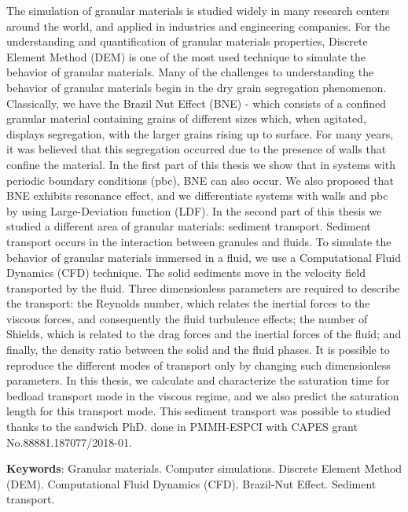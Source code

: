 
\begin{resumo}[Abstract]
    The simulation of granular materials is studied widely in many research centers around the world, and applied in industries and engineering companies. For the understanding and quantification of granular materials properties, Discrete Element Method (DEM) is one of the most used technique to simulate the behavior of granular materials.
    Many of the challenges to understanding the behavior of granular materials begin in the dry grain segregation phenomenon. Classically, we have the Brazil Nut Effect (BNE) - which consists of a confined granular material containing grains of different sizes which, when agitated, displays segregation, with the larger grains rising up to surface. For many years, it was believed that this segregation occurred due to the presence of walls that confine the material. In the first part of this thesis we show that in systems with periodic boundary conditions (pbc), BNE can also occur. We also proposed that BNE exhibits resonance effect, and we differentiate systems with walls and pbc by using Large-Deviation function (LDF).
    In the second part of this thesis we studied a different area of granular materials: sediment transport. Sediment transport occurs in the interaction between granules and fluids. To simulate the behavior of granular materials immersed in a fluid, we use a Computational Fluid Dynamics (CFD) technique. The solid sediments move in the velocity field transported by the fluid. Three dimensionless parameters are required to describe the transport: the Reynolds number, which relates the inertial forces to the viscous forces, and consequently the fluid turbulence effects; the number of Shields, which is related to the drag forces and the inertial forces of the fluid; and finally, the density ratio between the solid and the fluid phases. It is possible to reproduce the different modes of transport only by changing such dimensionless parameters. In this thesis, we calculate and characterize the saturation time for bedload transport mode in the viscous regime, and we also predict the saturation length for this transport mode. This sediment transport was possible to studied thanks to the sandwich PhD. done in PMMH-ESPCI with CAPES grant No.88881.187077/2018-01.

    \textbf{Keywords}: Granular materials. Computer simulations. Discrete Element Method (DEM). Computational Fluid Dynamics (CFD). Brazil-Nut Effect. Sediment transport.
\end{resumo}

